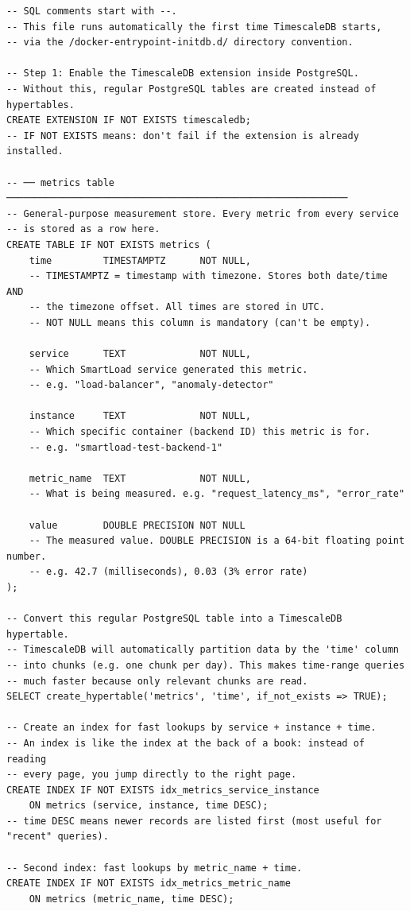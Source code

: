 \documentclass[12pt, a4paper]{article}
\begin{document}
\begin{lstlisting}[style=sql, caption={infrastructure/timescaledb/init.sql}]
-- SQL comments start with --.
-- This file runs automatically the first time TimescaleDB starts,
-- via the /docker-entrypoint-initdb.d/ directory convention.

-- Step 1: Enable the TimescaleDB extension inside PostgreSQL.
-- Without this, regular PostgreSQL tables are created instead of hypertables.
CREATE EXTENSION IF NOT EXISTS timescaledb;
-- IF NOT EXISTS means: don't fail if the extension is already installed.

-- ── metrics table ────────────────────────────────────────────────────────────
-- General-purpose measurement store. Every metric from every service
-- is stored as a row here.
CREATE TABLE IF NOT EXISTS metrics (
    time         TIMESTAMPTZ      NOT NULL,
    -- TIMESTAMPTZ = timestamp with timezone. Stores both date/time AND
    -- the timezone offset. All times are stored in UTC.
    -- NOT NULL means this column is mandatory (can't be empty).

    service      TEXT             NOT NULL,
    -- Which SmartLoad service generated this metric.
    -- e.g. "load-balancer", "anomaly-detector"

    instance     TEXT             NOT NULL,
    -- Which specific container (backend ID) this metric is for.
    -- e.g. "smartload-test-backend-1"

    metric_name  TEXT             NOT NULL,
    -- What is being measured. e.g. "request_latency_ms", "error_rate"

    value        DOUBLE PRECISION NOT NULL
    -- The measured value. DOUBLE PRECISION is a 64-bit floating point number.
    -- e.g. 42.7 (milliseconds), 0.03 (3% error rate)
);

-- Convert this regular PostgreSQL table into a TimescaleDB hypertable.
-- TimescaleDB will automatically partition data by the 'time' column
-- into chunks (e.g. one chunk per day). This makes time-range queries
-- much faster because only relevant chunks are read.
SELECT create_hypertable('metrics', 'time', if_not_exists => TRUE);

-- Create an index for fast lookups by service + instance + time.
-- An index is like the index at the back of a book: instead of reading
-- every page, you jump directly to the right page.
CREATE INDEX IF NOT EXISTS idx_metrics_service_instance
    ON metrics (service, instance, time DESC);
-- time DESC means newer records are listed first (most useful for "recent" queries).

-- Second index: fast lookups by metric_name + time.
CREATE INDEX IF NOT EXISTS idx_metrics_metric_name
    ON metrics (metric_name, time DESC);
\end{lstlisting}
\end{document}
